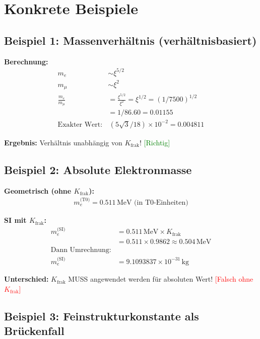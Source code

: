 \documentclass[12pt,a4paper]{article}
\begin{document}
	\section{Konkrete Beispiele}
	
	\subsection{Beispiel 1: Massenverhältnis (verhältnisbasiert)}
	
	\textbf{Berechnung:}
	\begin{align*}
		m_e &\sim \xi^{5/2} \\
		m_μ &\sim \xi^2 \\
		\frac{m_e}{m_μ} &= \frac{\xi^{5/2}}{\xi^2} = \xi^{1/2} = (1/7500)^{1/2} \\
		&= 1/86.60 = 0.01155 \\
		\text{Exakter Wert:} &\, (5\sqrt{3}/18) \times 10^{-2} = 0.004811
	\end{align*}
	
	\textbf{Ergebnis:} Verhältnis unabhängig von $K_{\text{frak}}$! \textcolor{green}{[Richtig]}
	
	\subsection{Beispiel 2: Absolute Elektronmasse}
	
	\textbf{Geometrisch (ohne $K_{\text{frak}}$):}
	\begin{align*}
		m_e^{\text{(T0)}} = 0.511\,\text{MeV (in T0-Einheiten)}
	\end{align*}
	
	\textbf{SI mit $K_{\text{frak}}$:}
	\begin{align*}
		m_e^{\text{(SI)}} &= 0.511\,\text{MeV} \times K_{\text{frak}} \\
		&= 0.511 \times 0.9862 \approx 0.504\,\text{MeV} \\
		\text{Dann Umrechnung:} & \\
		m_e^{\text{(SI)}} &= 9.1093837 \times 10^{-31}\,\text{kg}
	\end{align*}
	
	\textbf{Unterschied:} $K_{\text{frak}}$ MUSS angewendet werden für absoluten Wert! \textcolor{red}{[Falsch ohne $K_{\text{frak}}$]}
	
	\subsection{Beispiel 3: Feinstrukturkonstante als Brückenfall}
	
\end{document}
